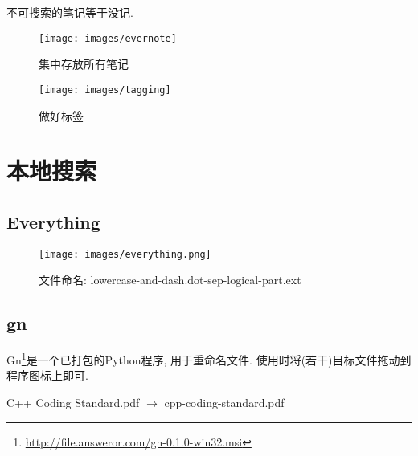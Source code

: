 \documentclass[compress]{beamer}
\newcommand{\footurl}[1]{\footnote{\url{#1}}}
\begin{document}
\begin{frame}
    \begin{center}
        \huge{\alert{不可搜索的笔记等于没记.}}
    \end{center}
\end{frame}

\begin{frame}{\insertsubsection}
    \begin{figure}
        \centering
        \texttt{[image: images/evernote]}
        \caption{集中存放所有笔记}
    \end{figure}
\end{frame}

\begin{frame}{\insertsubsection}
    \begin{figure}
        \centering
        \texttt{[image: images/tagging]}
        \caption{做好标签}
    \end{figure}
\end{frame}

\section{本地搜索}

\subsection{Everything}

\begin{frame}{\insertsubsection}
    \begin{figure}
        \centering
        \texttt{[image: images/everything.png]}
        \caption{文件命名: lowercase-and-dash.dot-sep-logical-part.ext}
    \end{figure}
\end{frame}

\subsection{gn}

\begin{frame}{\insertsubsection}
    Gn\footurl{http://file.answeror.com/gn-0.1.0-win32.msi}是一个已打包的Python程序, 用于重命名文件. 使用时将(若干)目标文件拖动到程序图标上即可.

    \begin{center}
        C++ Coding Standard.pdf $\to$ cpp-coding-standard.pdf
    \end{center}
\end{frame}
\end{document}
